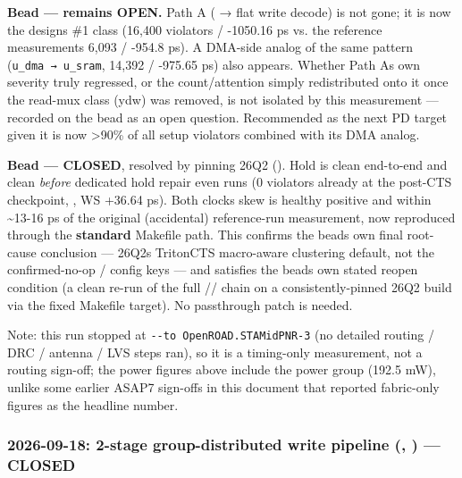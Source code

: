 \begin{record}
\textbf{Bead  --- remains OPEN.} Path A
( → flat write decode) is not gone; it is now
the design\textquotesingle s \#1 class (16,400 violators / -1050.16 ps
vs. the reference measurement\textquotesingle s 6,093 / -954.8 ps). A
DMA-side analog of the same pattern
(\texttt{u\_\allowbreak{}dma\ →\ u\_\allowbreak{}sram}, 14,392 / -975.65
ps) also appears. Whether Path A\textquotesingle s own severity truly
regressed, or the count/\allowbreak{}attention simply redistributed onto
it once the read-mux class (ydw) was removed, is not isolated by this
measurement --- recorded on the bead as an open question. Recommended as
the next PD target given it is now \textgreater90\% of all setup
violators combined with its DMA analog.

\textbf{Bead  --- CLOSED}, resolved by pinning 26Q2
(). Hold is clean end-to-end and clean \emph{before} dedicated
hold repair even runs (0 violators already at the post-CTS checkpoint,
, WS +36.64 ps). Both
clocks\textquotesingle{} skew is healthy positive and within
\textasciitilde13-16 ps of the original (accidental) reference-run
measurement, now reproduced through the \textbf{standard} Makefile path.
This confirms the bead\textquotesingle s own final root-cause conclusion
--- 26Q2\textquotesingle s TritonCTS macro-aware clustering default, not
the confirmed-no-op /
 config keys --- and satisfies the
bead\textquotesingle s own stated reopen condition (a clean re-run of
the full // chain on a consistently-pinned
26Q2 build via the fixed Makefile target). No  passthrough
patch is needed.

Note: this run stopped at
\texttt{-\allowbreak{}-\allowbreak{}to\ OpenROAD.\allowbreak{}STAMidPNR-\allowbreak{}3}
(no detailed routing / DRC / antenna / LVS steps ran), so it is a
timing-only measurement, not a routing sign-off; the power figures above
include the  power group (192.5 mW), unlike some earlier
ASAP7 sign-offs in this document that reported fabric-only figures as
the headline number.

\end{record}

\subsubsection{\texorpdfstring{2026-09-18: 2-stage group-distributed
write pipeline (, ) ---
CLOSED}{2026-09-18: 2-stage group-distributed write pipeline (, ) ---  CLOSED}}\label{cr:run:phase5:2026-09-18-2-stage-group-distributed-write-pipeline-soc-rvb2-run-2026-09-17-20-41-11-rvb-closed}

